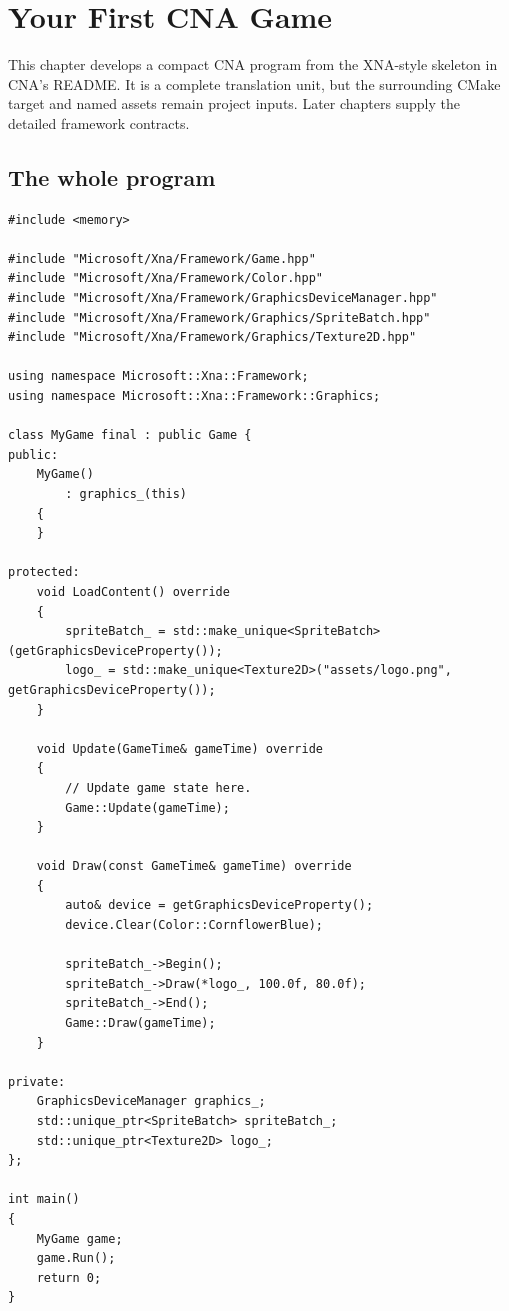 \chapter{Your First CNA Game}
\label{ch:first-game}

This chapter develops a compact CNA program from the XNA-style skeleton in CNA's README. It is
a complete translation unit, but the surrounding CMake target and named assets remain project
inputs. Later chapters supply the detailed framework contracts.

\section{The whole program}

\begin{lstlisting}
#include <memory>

#include "Microsoft/Xna/Framework/Game.hpp"
#include "Microsoft/Xna/Framework/Color.hpp"
#include "Microsoft/Xna/Framework/GraphicsDeviceManager.hpp"
#include "Microsoft/Xna/Framework/Graphics/SpriteBatch.hpp"
#include "Microsoft/Xna/Framework/Graphics/Texture2D.hpp"

using namespace Microsoft::Xna::Framework;
using namespace Microsoft::Xna::Framework::Graphics;

class MyGame final : public Game {
public:
    MyGame()
        : graphics_(this)
    {
    }

protected:
    void LoadContent() override
    {
        spriteBatch_ = std::make_unique<SpriteBatch>(getGraphicsDeviceProperty());
        logo_ = std::make_unique<Texture2D>("assets/logo.png", getGraphicsDeviceProperty());
    }

    void Update(GameTime& gameTime) override
    {
        // Update game state here.
        Game::Update(gameTime);
    }

    void Draw(const GameTime& gameTime) override
    {
        auto& device = getGraphicsDeviceProperty();
        device.Clear(Color::CornflowerBlue);

        spriteBatch_->Begin();
        spriteBatch_->Draw(*logo_, 100.0f, 80.0f);
        spriteBatch_->End();
        Game::Draw(gameTime);
    }

private:
    GraphicsDeviceManager graphics_;
    std::unique_ptr<SpriteBatch> spriteBatch_;
    std::unique_ptr<Texture2D> logo_;
};

int main()
{
    MyGame game;
    game.Run();
    return 0;
}
\end{lstlisting}

